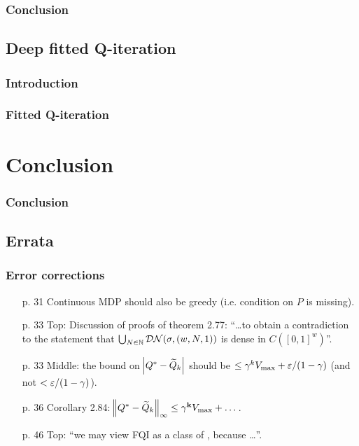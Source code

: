 \documentclass{beamer}[10]
\begin{document}
\begin{frame}
  \frametitle{Conclusion}

\end{frame}

\subsection{Deep fitted Q-iteration}

\begin{frame}
  \frametitle{Introduction}

\end{frame}

\begin{frame}
  \frametitle{Fitted Q-iteration}

\end{frame}



\section{Conclusion}

\begin{frame}
  \frametitle{Conclusion}
\end{frame}

\subsection{Errata}

\begin{frame}
  \frametitle{Error corrections}
  \begingroup
  \footnotesize
  \begin{itemize}
    \item[p. 31] Continuous MDP should also be greedy (i.e. condition on $P$
      is missing).
    \item[p. 33] Top: Discussion of proofs of theorem 2.77:
      ``\ldots to obtain a contradiction to the statement that
      $\bigcup_{N \in \mathbb{N}} \mathcal{DN}(\sigma, (w,N,1))$
      is  dense in $C([0,1]^w)$''.
    \item[p. 33] Middle: the bound on $\abs{Q^* - \widetilde{Q}_k}$ should be
      $\leq \gamma^k V_{\max} + \varepsilon / (1-\gamma)$ (and not 
      $< \varepsilon / (1-\gamma)$).
    \item[p. 36] Corollary 2.84: $\norm{Q^* - \widetilde{Q}_k}_\infty \leq \gamma^{
      \mathbf{k}} V_{\max} + \dots$.
    \item[p. 46] Top: ``we may view FQI as a class of ,
      because \ldots''.
  \end{itemize}
  \endgroup
\end{frame}
\end{document}
